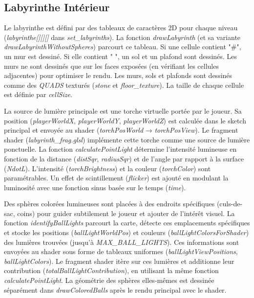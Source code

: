 \documentclass[12pt,oneside,letterpaper]{article}
\begin{document}
\subsection{Labyrinthe Intérieur}
Le labyrinthe est défini par des tableaux
de caractères 2D pour chaque niveau (\textit{labyrinthe[][][]} dans
\textit{set\_labyrinths}). La fonction \textit{drawLabyrinth} (et sa variante
\textit{drawLabyrinthWithoutSpheres}) parcourt ce tableau. Si une cellule
contient "\#", un mur est dessiné. Si elle contient " ", un sol et un plafond
sont dessinés. Les murs ne sont dessinés que sur les faces exposées (en
vérifiant les cellules adjacentes) pour optimiser le rendu. Les murs, sols et
plafonds sont dessinés comme des \textit{QUADS} texturés (\textit{stone} et \textit{floor\_texture}). La
taille de chaque cellule est définie par \textit{cellSize}.

La source de lumière principale est une torche virtuelle portée par le joueur. Sa position (\textit{playerWorldX}, \textit{playerWorldY}, \textit{playerWorldZ}) est calculée dans le sketch principal et envoyée au shader (\textit{torchPosWorld} → \textit{torchPosView}). Le fragment shader (\textit{labyrinth\_frag.glsl}) implémente cette torche comme une source de lumière ponctuelle. La fonction \textit{calculatePointLight} détermine l'intensité lumineuse en fonction de la distance (\textit{distSqr}, \textit{radiusSqr}) et de l'angle par rapport à la surface (\textit{NdotL}). L'intensité (\textit{torchBrightness}) et la couleur (\textit{torchColor}) sont paramétrables. Un effet de scintillement (\textit{flicker}) est ajouté en modulant la luminosité avec une fonction sinus basée sur le temps (\textit{time}).

Des sphères colorées lumineuses sont placées à des endroits spécifiques (culs-de-sac, coins) pour guider subtilement le joueur et ajouter de l'intérêt visuel. La fonction \textit{identifyBallLights} parcourt la carte, détecte ces emplacements spécifiques et stocke les positions (\textit{ballLightWorldPos}) et couleurs (\textit{ballLightColorsForShader}) des lumières trouvées (jusqu'à \textit{MAX\_BALL\_LIGHTS}). Ces informations sont envoyées au shader sous forme de tableaux uniformes (\textit{ballLightViewPositions}, \textit{ballLightColors}). Le fragment shader itère sur ces lumières et additionne leur contribution (\textit{totalBallLightContribution}), en utilisant la même fonction \textit{calculatePointLight}. La géométrie des sphères elles-mêmes est dessinée séparément dans \textit{drawColoredBalls} après le rendu principal avec le shader.
\end{document}
